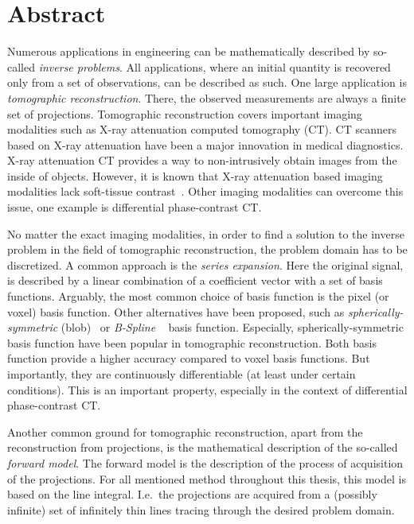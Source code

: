 \chapter*{Abstract}

\noindent%
Numerous applications in engineering can be mathematically described by so-called \textit{inverse
	problems}. All applications, where an initial quantity is recovered only from a set of observations,
can be described as such. One large application is \textit{tomographic reconstruction}. There, the
observed measurements are always a finite set of projections. Tomographic reconstruction covers
important imaging modalities such as X-ray attenuation computed tomography (CT). CT scanners based
on X-ray attenuation have been a major innovation in medical diagnostics. X-ray attenuation CT
provides a way to non-intrusively obtain images from the inside of objects. However, it is known
that X-ray attenuation based imaging modalities lack soft-tissue
contrast~\cite{pfeiffer_phase_2006}. Other imaging modalities can overcome this issue, one example
is differential phase-contrast CT\@.

No matter the exact imaging modalities, in order to find a solution to the inverse problem in the
field of tomographic reconstruction, the problem domain has to be discretized. A common approach is
the \textit{series expansion}. Here the original signal, is described by a linear combination of a
coefficient vector with a set of basis functions. Arguably, the most common choice of basis function
is the pixel (or voxel) basis function. Other alternatives have been proposed, such as
\textit{spherically-symmetric} (blob)~\cite{lewitt_multidimensional_1990} or \textit{B-Spline}
~\cite{unser_fast_1991} basis function. Especially, spherically-symmetric basis function have been
popular in tomographic reconstruction. Both basis function provide a higher accuracy compared to
voxel basis functions. But importantly, they are continuously differentiable (at least under certain
conditions). This is an important property, especially in the context of differential phase-contrast
CT\@.

Another common ground for tomographic reconstruction, apart from the reconstruction from
projections, is the mathematical description of the so-called \textit{forward model}. The forward
model is the description of the process of acquisition of the projections. For all mentioned method
throughout this thesis, this model is based on the line integral. I.e.\ the projections are acquired
from a (possibly infinite) set of infinitely thin lines tracing through the desired problem domain.

